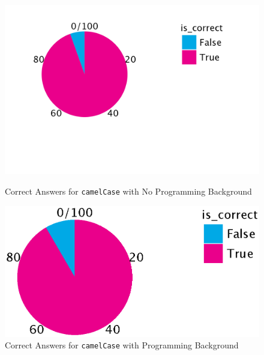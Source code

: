 \documentclass[unicode,11pt,a4paper,oneside,numbers=endperiod,openany]{scrartcl}
\begin{document}
\begin{figure}[h!]
    \centering
    \begin{minipage}{0.45\textwidth}
        \centering
        \includegraphics[width=\textwidth]{./figures/correct_camel_noback.png}
        \caption{Correct Answers for \texttt{camelCase} with No Programming Background}
        \label{fig:correct_camel_noback}
    \end{minipage}
    \hfill
    \begin{minipage}{0.45\textwidth}
        \centering
        \includegraphics[width=\textwidth]{./figures/correct_camel_background.eps}
        \caption{Correct Answers for \texttt{camelCase} with Programming Background}
        \label{fig:correct_camel_background}
    \end{minipage}
    
    \vspace{0.5cm} 
    

\end{figure}
\end{document}
